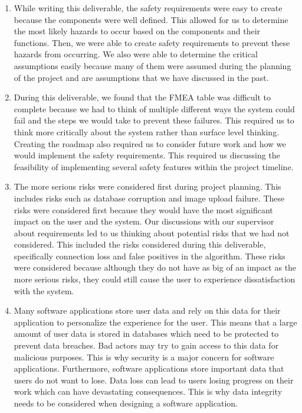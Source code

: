 \documentclass{article}
\begin{document}
\begin{enumerate}
    \item While writing this deliverable, the safety requirements were easy to create because the components were well defined. This allowed for us to determine the most likely hazards to occur based on the
    components and their functions. Then, we were able to create safety requirements to prevent these hazards from occurring. We also were able to determine the critical assumptions easily because many of
    them were assumed during the planning of the project and are assumptions that we have discussed in the past.
    \item During this deliverable, we found that the FMEA table was difficult to complete because we had to think of multiple different ways the system could fail and the steps we would take to prevent these failures. This
    required us to think more critically about the system rather than surface level thinking. Creating the roadmap also required us to consider future work and how we would implement the safety requirements. This required us
    discussing the feasibility of implementing several safety features within the project timeline.
    \item The more serious risks were considered first during project planning. This includes risks such as database corruption and image upload failure. These risks were considered first because they would have the most
    significant impact on the user and the system. Our discussions with our supervisor about requirements led to us thinking about potential risks that we had not considered. This included the risks considered
    during this deliverable, specifically connection loss and false positives in the algorithm. These risks were considered because although they do not have as big of an impact as the more serious risks, they
    could still cause the user to experience dissatisfaction with the system.
    \item Many software applications store user data and rely on this data for their application to personalize the experience for the user. This means that a large amount of user data is stored in databases which need to
    be protected to prevent data breaches. Bad actors may try to gain access to this data for malicious purposes. This is why security is a major concern for software applications. Furthermore, software applications store
    important data that users do not want to lose. Data loss can lead to users losing progress on their work which can have devastating consequences. This is why data integrity needs to be considered when designing a
    software application.
\end{enumerate}
\end{document}
